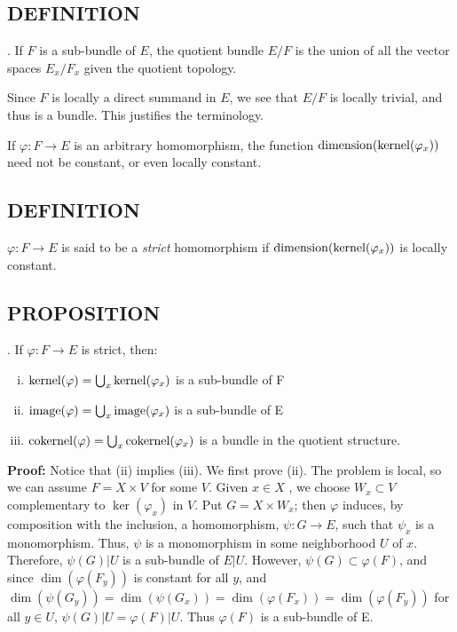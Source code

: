 \subsection{DEFINITION}. If $F$ is a sub-bundle of $E$, the quotient bundle $E/F$ is the union of all the vector spaces $E_x/F_x$ given the quotient topology. \par 

Since $F$ is locally a direct summand in $E$, we see that $E/F$ is locally trivial, and thus is a bundle. This justifies the terminology. \par 

If $\varphi: F \to E$ is an arbitrary homomorphism, the function $\operatorname{dimension}(\operatorname{kernel}(\varphi_x))$ need not be constant, or even locally constant. \par 

\subsection{DEFINITION} $\varphi: F \to E$ is said to be a \textit{strict} homomorphism if $\operatorname{dimension}(\operatorname{kernel}(\varphi_x))$ is locally constant. \par 

\subsection{PROPOSITION}. If $\varphi: F \to E$ is strict, then:
\begin{enumerate}[(i)]
    \item $\operatorname{kernel}(\varphi) = \bigcup_x \operatorname{kernel}(\varphi_x)$ is a sub-bundle of F
    \item $\operatorname{image}(\varphi) = \bigcup_x \operatorname{image}(\varphi_x)$ is a sub-bundle of E
    \item $\operatorname{cokernel}(\varphi) = \bigcup_x \operatorname{cokernel}(\varphi_x)$ is a bundle in the quotient structure.
\end{enumerate}

\textbf{Proof:} Notice that (ii) implies (iii). We first prove (ii). The problem is local, so we can assume $F = X \times V$ for some $V$. Given $x \in X$ , we choose $W_x \subset V$ complementary to $\ker(\varphi_x)$ in $V$. Put $G = X \times W_x$; then $\varphi$ induces, by composition with the inclusion, a homomorphism, $\psi: G \to E$, such that $\psi_x$ is a monomorphism. Thus, $\psi$ is a monomorphism in some neighborhood $U$ of $x$. Therefore, $\psi(G) \vert U$ is a sub-bundle of $E \vert U$. However, $\psi(G) \subset \varphi(F)$, and since $\dim(\varphi(F_y))$ is constant for all $y$, and $\dim(\psi(G_y)) = \dim(\psi(G_x)) = \dim(\varphi(F_x)) = \dim(\varphi(F_y))$ for all $y \in U$, $\psi(G) \vert U = \varphi(F) \vert U$. Thus $\varphi(F)$ is a sub-bundle of E. \par 

